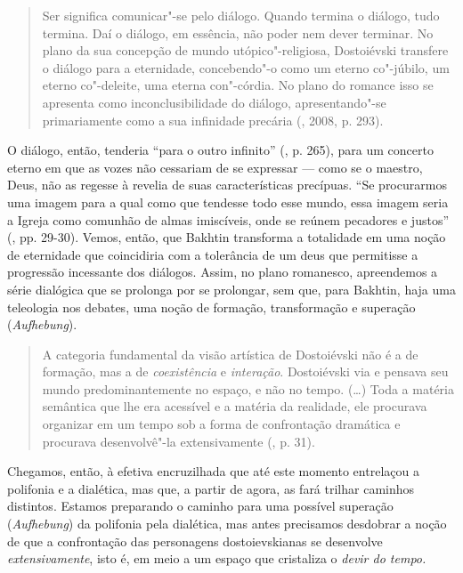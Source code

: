 \begin{quote}
Ser significa comunicar"-se pelo diálogo. Quando termina o diálogo, tudo
termina. Daí o diálogo, em essência, não poder nem dever terminar. No
plano da sua concepção de mundo utópico"-religiosa, Dostoiévski transfere
o diálogo para a eternidade, concebendo"-o como um eterno co"-júbilo, um
eterno co"-deleite, uma eterna con"-córdia. No plano do romance isso se
apresenta como inconclusibilidade do diálogo, apresentando"-se
primariamente como a sua infinidade precária (, 2008, p. 293).
\end{quote}

O diálogo, então, tenderia ``para o outro infinito'' (, p. 265),
para um concerto eterno em que as vozes não cessariam de se expressar ---
como se o maestro, Deus, não as regesse à revelia de suas
características precípuas. ``Se procurarmos uma imagem para a qual como
que tendesse todo esse mundo, essa imagem seria a Igreja como comunhão
de almas imiscíveis, onde se reúnem pecadores e justos'' (, pp.
29-30). Vemos, então, que Bakhtin transforma a totalidade em uma noção
de eternidade que coincidiria com a tolerância de um deus que permitisse
a progressão incessante dos diálogos. Assim, no plano romanesco,
apreendemos a série dialógica que se prolonga por se prolongar, sem que,
para Bakhtin, haja uma teleologia nos debates, uma noção de formação,
transformação e superação (\emph{Aufhebung}).

\begin{quote}
A categoria fundamental da visão artística de Dostoiévski não é a de
formação, mas a de \emph{coexistência} e \emph{interação}. Dostoiévski
via e pensava seu mundo predominantemente no espaço, e não no tempo.
(\ldots) Toda a matéria semântica que lhe era acessível e a matéria da
realidade, ele procurava organizar em um tempo sob a forma de
confrontação dramática e procurava desenvolvê"-la extensivamente (,
p. 31).
\end{quote}

Chegamos, então, à efetiva encruzilhada que até este momento entrelaçou
a polifonia e a dialética, mas que, a partir de agora, as fará trilhar
caminhos distintos. Estamos preparando o caminho para uma possível
superação (\emph{Aufhebung}) da polifonia pela dialética, mas antes
precisamos desdobrar a noção de que a confrontação das personagens
dostoievskianas se desenvolve \emph{extensivamente}, isto é, em meio a
um espaço que cristaliza o \emph{devir do tempo.}

